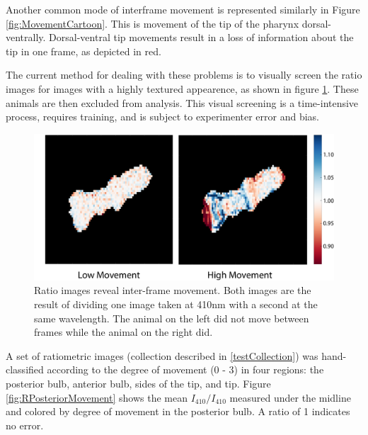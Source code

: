 Another common mode of interframe movement is represented similarly in Figure \ref{fig:MovementCartoon}. This is movement of the tip of the pharynx dorsal-ventrally. Dorsal-ventral tip movements result in a loss of information about the tip in one frame, as depicted in red.

The current method for dealing with these problems is to visually screen the ratio images for images with a highly textured appearence, as shown in figure \ref{fig:HighMovement}. These animals are then excluded from analysis. This visual screening is a time-intensive process, requires training, and is subject to experimenter error and bias.

\begin{figure}[ht]
    \centering
    \includegraphics[scale=0.3]{Figures/rendered_files/low_high_movement}
    \decoRule
    \caption[A ratio image reveals inter-frame movement]{Ratio images reveal inter-frame movement. Both images are the result of dividing one image taken at 410nm with a second at the same wavelength. The animal on the left did not move between frames while the animal on the right did.}
    \label{fig:HighMovement}
\end{figure}

A set of ratiometric images (collection described in \ref{testCollection}) was hand-classified according to the degree of movement (0 - 3) in four regions: the posterior bulb, anterior bulb, sides of the tip, and tip. Figure \ref{fig:RPosteriorMovement} shows the mean $I_{410}/I_{410}$ measured under the midline and colored by degree of movement in the posterior bulb. A ratio of 1 indicates no error.

